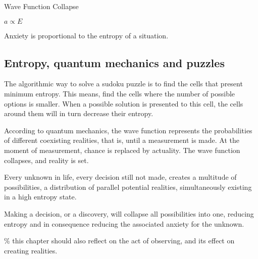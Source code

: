 \begin{center}
\Huge Wave Function Collapse
\vspace{2cm}
\begin{flushright}
\large
\textit{ $a \propto E$ }
\end{flushright}
\vspace{2cm}
\end{center}
\normalsize

Anxiety is proportional to the entropy of a situation. 

\subsection*{ Entropy, quantum mechanics and puzzles} 

The algorithmic way to solve a sudoku puzzle is to find the cells 
that present minimum entropy. 
This means, find the cells where the number of possible options is smaller.
When a possible solution is presented to this cell, the cells around them will 
in turn decrease their entropy. 

According to quantum mechanics, the wave function represents the probabilities 
of different coexisting realities, that is, until a 
measurement is made. At the moment of measurement, chance is replaced by 
actuality. The wave function collapses, and reality is set.

Every unknown in life, every decision still not made, creates a multitude of 
possibilities, a distribution of parallel potential realities, simultaneously 
existing in a high entropy state. 

Making a decision, or a discovery, will collapse all possibilities into one, 
reducing entropy and in consequence reducing the associated anxiety for the unknown. 

{\scriptsize \textcolor{comment}{\%  this chapter should also reflect on the act of observing, and its effect on creating realities. }}




